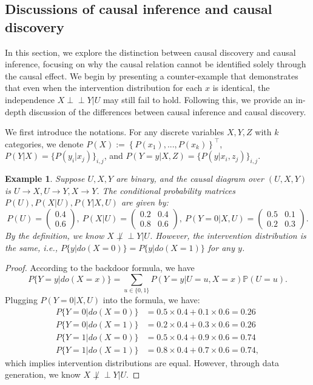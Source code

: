 \documentclass[
  12pt]{article}
\newtheorem{example}{Example}
\def\to{\rightarrow}
\newcommand{\ind}{\perp\!\!\!\!\perp}
\def\mP{\mathbb{P}}
\begin{document}
\subsection{Discussions of causal inference and causal discovery}
\label{appx.example_intervention}


In this section, we explore the distinction between causal discovery and causal inference, focusing on why the causal relation cannot be identified solely through the causal effect. We begin by presenting a counter-example that demonstrates that even when the intervention distribution for each $x$ is identical, the independence $X \ind Y | U$ may still fail to hold. Following this, we provide an in-depth discussion of the differences between causal inference and causal discovery.

We first introduce the notations. For any discrete variables $X,Y,Z$ with $k$ categories, we denote $P(X):=\left\{P(x_1),...,P(x_k)\right\}^\top$, 
 $P(Y|X) = \{P(y_i|x_j)\}_{i,j}$, and $P(Y=y|X,Z)=\{P(y|x_i,z_j)\}_{i,j}$. 

\begin{example}
   Suppose $U,X,Y$ are binary, and the causal diagram over $(U,X,Y)$ is $U \to X, U \to Y, X \to Y$. The conditional probability matrices $P(U), P(X|U), P(Y|X,U)$ are given by:
$$
P(U)= \begin{pmatrix}
0.4\\0.6
\end{pmatrix}, \ 
P(X|U)= 
\begin{pmatrix}
0.2&0.4\\
0.8&0.6
\end{pmatrix}, \ 
P(Y=0|X,U)=
\begin{pmatrix}
0.5&0.1\\
0.2&0.3
\end{pmatrix}.
$$ 
By the definition, we know $X \not\ind Y|U$. However, the intervention distribution is the same, \emph{i.e.}, $P\{y|do(X=0)\}=P\{y|do(X=1)\}$ for any $y$.
\end{example}

\begin{proof}
   According to the backdoor formula, we have
$$
P\{Y=y|do(X=x)\} =\sum_{u\in\{ 0,1\}}{P(Y=y|U=u,X=x) \mP(U=u)}.
$$
Plugging $P(Y=0|X,U)$ into the formula, we have:
$$
\begin{aligned}
	P\{Y=0|do(X=0)\} &=0.5\times 0.4+0.1\times 0.6=0.26\\
	P\{ Y=0|do(X=1) \} &=0.2\times 0.4+0.3\times 0.6=0.26\\
	P\{ Y=1|do(X=0) \} &=0.5\times 0.4+0.9\times 0.6=0.74\\
    P\{ Y=1|do(X=1) \} &=0.8\times 0.4+0.7\times 0.6=0.74,
\end{aligned}
$$
which implies intervention distributions are equal. However, through data generation, we know $X\not\ind Y|U$. 
\end{proof}
\end{document}
